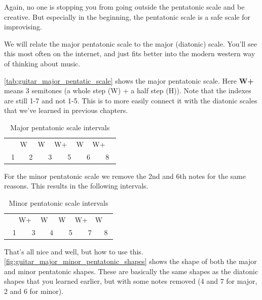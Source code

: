Again, no one is stopping you from going outside the pentatonic scale and be creative. But especially in the beginning, the pentatonic scale is a safe scale for improvising.

\newpage

We will relate the major pentatonic scale to the major (diatonic) scale. You'll see this most often on the internet, and just fits better into the modern western way of thinking about music.

\autoref{tab:guitar_major_pentatic_scale} shows the major pentatonic scale. Here \textbf{W+} means 3 semitones (a whole step (W) + a half step (H)). Note that the indexes are still 1-7 and not 1-5. This is to more easily connect it with the diatonic scales that we've learned in previous chapters.

\begin{table}[h]
	\centering
	\begin{tabular}{*{12}{c}}
		& \multicolumn{2}{P{4mm}}{\large{W}} & \multicolumn{2}{P{4mm}}{\large{W}} & \multicolumn{2}{P{4mm}}{\large{W+}} & \multicolumn{2}{P{4mm}}{\large{W}} & \multicolumn{2}{P{4mm}}{\large{W+}} & \\
		\multicolumn{2}{P{4mm}}{1} & \multicolumn{2}{P{4mm}}{2} & \multicolumn{2}{P{4mm}}{3} & \multicolumn{2}{P{4mm}}{5} & \multicolumn{2}{P{4mm}}{6} & \multicolumn{2}{P{4mm}}{8}
	\end{tabular}
	\caption{Major pentatonic scale intervals}
	\label{tab:guitar_major_pentatic_scale}
\end{table}

For the minor pentatonic scale we remove the 2nd and 6th notes for the same reasons. This results in the following intervals.

\begin{table}[h]
	\centering
	\begin{tabular}{*{12}{c}}
		& \multicolumn{2}{P{4mm}}{\large{W+}} & \multicolumn{2}{P{4mm}}{\large{W}} & \multicolumn{2}{P{4mm}}{\large{W}} & \multicolumn{2}{P{4mm}}{\large{W+}} & \multicolumn{2}{P{4mm}}{\large{W}} & \\
		\multicolumn{2}{P{4mm}}{1} & \multicolumn{2}{P{4mm}}{3} & \multicolumn{2}{P{4mm}}{4} & \multicolumn{2}{P{4mm}}{5} & \multicolumn{2}{P{4mm}}{7} & \multicolumn{2}{P{4mm}}{8}
	\end{tabular}
	\caption{Minor pentatonic scale intervals}
	\label{tab:guitar_minor_pentatic_scale}
\end{table}


That's all nice and well, but how to use this. \autoref{fig:guitar_major_minor_pentatonic_shapes} shows the shape of both the major and minor pentatonic shapes. These are basically the same shapes as the diatonic shapes that you learned earlier, but with some notes removed (4 and 7 for major, 2 and 6 for minor).

